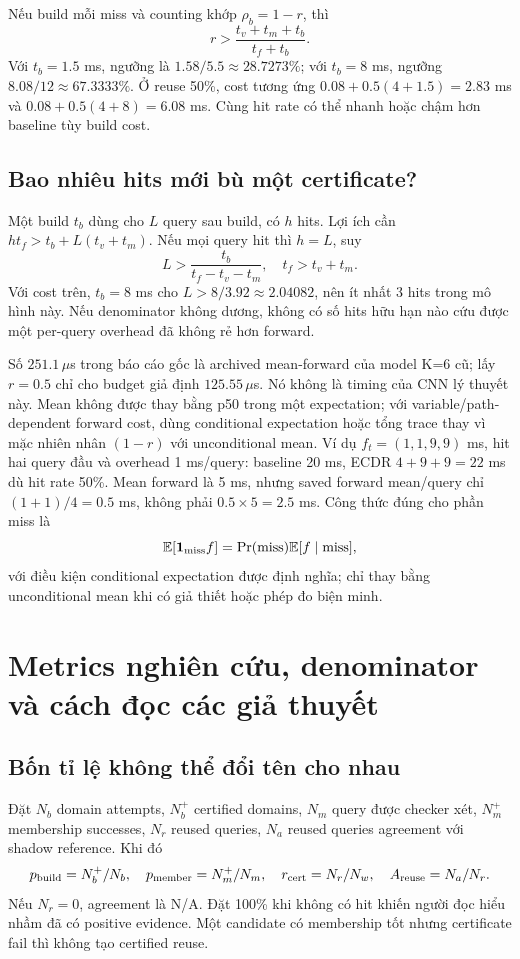 \documentclass[11pt,a4paper]{article}
\newcommand{\ind}{\mathbf1}
\newcommand{\E}{\mathbb E}
\theoremstyle{definition}
\begin{document}
Nếu build mỗi miss và counting khớp $\rho_b=1-r$, thì
\begin{equation}
r>\frac{t_v+t_m+t_b}{t_f+t_b}.
\end{equation}
Với $t_b=1.5$ ms, ngưỡng là $1.58/5.5\approx28.7273\%$;
với $t_b=8$ ms, ngưỡng $8.08/12\approx67.3333\%$. Ở reuse 50\%, cost
tương ứng $0.08+0.5(4+1.5)=2.83$ ms và $0.08+0.5(4+8)=6.08$ ms.
Cùng hit rate có thể nhanh hoặc chậm hơn baseline tùy build cost.

\subsection{Bao nhiêu hits mới bù một certificate?}
Một build $t_b$ dùng cho $L$ query sau build, có $h$ hits. Lợi ích cần
$ht_f>t_b+L(t_v+t_m)$. Nếu mọi query hit thì $h=L$, suy
\begin{equation}
L>\frac{t_b}{t_f-t_v-t_m},\quad t_f>t_v+t_m.
\end{equation}
Với cost trên, $t_b=8$ ms cho $L>8/3.92\approx2.04082$, nên ít nhất
3 hits trong mô hình này. Nếu denominator không dương, không có số hits
hữu hạn nào cứu được một per-query overhead đã không rẻ hơn forward.

Số $251.1\,\mu$s trong báo cáo gốc là archived mean-forward của model K=6
cũ; lấy $r=0.5$ chỉ cho budget giả định $125.55\,\mu$s. Nó không là timing
của CNN lý thuyết này. Mean không được thay bằng p50 trong một expectation;
với variable/path-dependent forward cost, dùng conditional expectation hoặc
tổng trace thay vì mặc nhiên nhân $(1-r)$ với unconditional mean.
Ví dụ $f_t=(1,1,9,9)$ ms, hit hai query đầu và overhead 1 ms/query:
baseline 20 ms, ECDR $4+9+9=22$ ms dù hit rate 50\%. Mean forward là
5 ms, nhưng saved forward mean/query chỉ $(1+1)/4=0.5$ ms, không phải
$0.5\times5=2.5$ ms. Công thức đúng cho phần miss là
\begin{equation}
\E[\ind_{\rm miss}f]=\Pr(\mathrm{miss})\E[f\mid\mathrm{miss}],
\end{equation}
với điều kiện conditional expectation được định nghĩa; chỉ thay bằng
unconditional mean khi có giả thiết hoặc phép đo biện minh.

\section{Metrics nghiên cứu, denominator và cách đọc các giả thuyết}
\subsection{Bốn tỉ lệ không thể đổi tên cho nhau}
Đặt $N_b$ domain attempts, $N_b^+$ certified domains, $N_m$ query được
checker xét, $N_m^+$ membership successes, $N_r$ reused queries, $N_a$
reused queries agreement với shadow reference. Khi đó
\begin{equation}
p_{\rm build}=N_b^+/N_b,\quad
p_{\rm member}=N_m^+/N_m,\quad
r_{\rm cert}=N_r/N_w,\quad A_{\rm reuse}=N_a/N_r.
\end{equation}
Nếu $N_r=0$, agreement là N/A. Đặt 100\% khi không có hit khiến người đọc
hiểu nhầm đã có positive evidence. Một candidate có membership tốt nhưng
certificate fail thì không tạo certified reuse.
\end{document}
